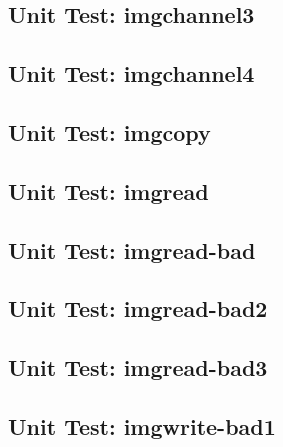 \subsection*{Unit Test: imgchannel3}

 \clearpage
\subsection*{Unit Test: imgchannel4}

 \clearpage
\subsection*{Unit Test: imgcopy}

 \clearpage
\subsection*{Unit Test: imgread}

 \clearpage
\subsection*{Unit Test: imgread-bad}

 \clearpage
\subsection*{Unit Test: imgread-bad2}

 \clearpage
\subsection*{Unit Test: imgread-bad3}

 \clearpage
\subsection*{Unit Test: imgwrite-bad1}

 \clearpage

